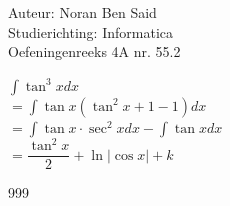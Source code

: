 \documentclass[a4paper]{article}
\begin{document}
  
\noindent \large Auteur: Noran Ben Said \\
\noindent \large Studierichting: Informatica\\
\noindent \large Oefeningenreeks 4A nr. 55.2\\

\medskip

\normalsize

$ \displaystyle\int \tan^3 x dx $ \\

$ = \displaystyle\int \tan x \left(\tan^2x + 1 - 1\right) dx $ \\

$ = \displaystyle\int \tan x \cdot \sec^2 x dx - \displaystyle\int \tan x dx $ \\

$ = \dfrac{\tan^2 x}{2} + \ln|\cos x| + k$\\

\begin{thebibliography}{999}
\end{thebibliography}
\end{document}
